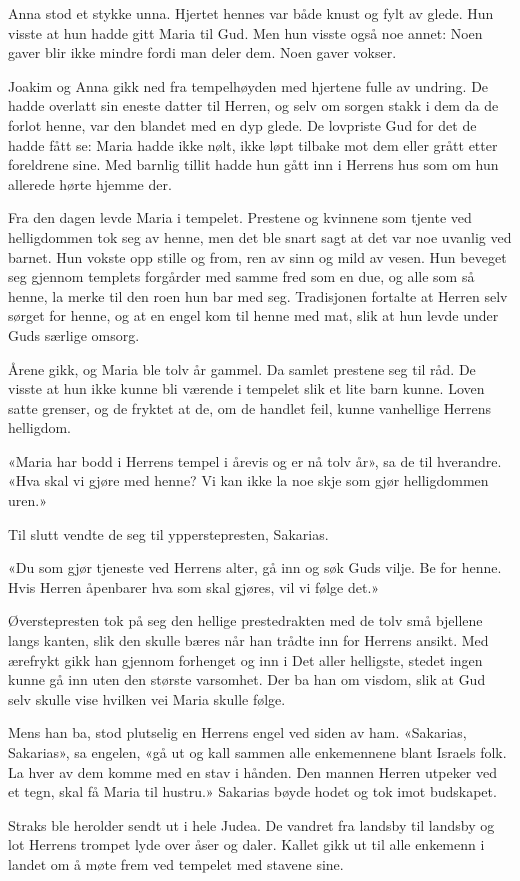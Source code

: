Anna stod et stykke unna.
Hjertet hennes var både knust og fylt av glede.
Hun visste at hun hadde gitt Maria til Gud.
Men hun visste også noe annet:
Noen gaver blir ikke mindre fordi man deler dem.
Noen gaver vokser.


Joakim og Anna gikk ned fra tempelhøyden med hjertene fulle av undring.
De hadde overlatt sin eneste datter til Herren, og selv om sorgen
stakk i dem da de forlot henne, var den blandet med en dyp glede.
De lovpriste Gud for det de hadde fått se: Maria hadde ikke nølt,
ikke løpt tilbake mot dem eller grått etter foreldrene sine.
Med barnlig tillit hadde hun gått inn i Herrens hus som om hun
allerede hørte hjemme der.

Fra den dagen levde Maria i tempelet. Prestene og kvinnene
som tjente ved helligdommen tok seg av henne, men det ble snart
sagt at det var noe uvanlig ved barnet. Hun vokste opp stille og
from, ren av sinn og mild av vesen. Hun beveget seg gjennom
templets forgårder med samme fred som en due, og alle som så henne,
la merke til den roen hun bar med seg. Tradisjonen fortalte at
Herren selv sørget for henne, og at en engel kom til
henne med mat, slik at hun levde under Guds særlige omsorg.

Årene gikk, og Maria ble tolv år gammel.
Da samlet prestene seg til råd. De visste at hun ikke kunne bli
værende i tempelet slik et lite barn kunne. Loven satte grenser,
og de fryktet at de, om de handlet feil, kunne vanhellige Herrens helligdom.

«Maria har bodd i Herrens tempel i  årevis og er nå tolv år»,
sa de til hverandre.
«Hva skal vi gjøre med henne? Vi kan ikke la noe skje som
gjør helligdommen uren.»

Til slutt vendte de seg til ypperstepresten, Sakarias.

«Du som gjør tjeneste ved Herrens alter, gå inn og søk Guds vilje.
Be for henne. Hvis Herren åpenbarer hva som skal gjøres, vil vi følge det.»

Øverstepresten tok på seg den hellige prestedrakten med de
tolv små bjellene langs kanten, slik den skulle bæres når han
trådte inn for Herrens ansikt. Med ærefrykt gikk han gjennom
forhenget og inn i Det aller helligste,
stedet ingen kunne gå inn uten den største varsomhet.
Der ba han om visdom, slik at Gud selv skulle
vise hvilken vei Maria skulle følge.

Mens han ba, stod plutselig en Herrens engel ved siden av ham.
«Sakarias, Sakarias», sa engelen,
«gå ut og kall sammen alle enkemennene blant Israels folk.
La hver av dem komme med en stav i hånden.
Den mannen Herren utpeker ved et tegn, skal få Maria til hustru.»
Sakarias bøyde hodet og tok imot budskapet.

Straks ble herolder sendt ut i hele Judea.
De vandret fra landsby til landsby og lot
Herrens trompet lyde over åser og daler.
Kallet gikk ut til alle enkemenn i landet om å møte
frem ved tempelet med stavene sine.


